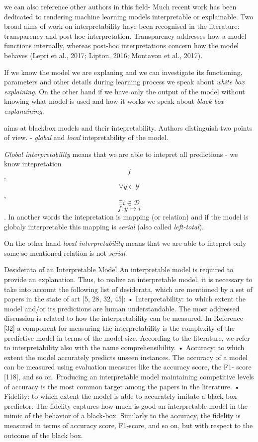     we can also reference other authors in this field- \cite{Mittelstadt2019}
    Much recent work has been dedicated to rendering machine learning models interpretable or explainable. Two broad aims of work on
    interpretability have been recognised in the literature: transparency
    and post-hoc interpretation. Transparency addresses how a model
    functions internally, whereas post-hoc interpretations concern how
    the model behaves (Lepri et al., 2017; Lipton, 2016; Montavon et al.,
    2017).



If we know the model we are explaning and we can investigate its functioning, parameters and other details during learning process we speak about \emph{white box explaining}. On the other hand if we have only the output of the model without knowing what model is used and how it works we speak about \emph{black box explanaining}.

\cite{Guidotti2018} aims at blackbox models and their intepretability. Authors distinguish two points of view. - \emph{global} and \emph{local} intepretability of the model.

\emph{Global interpretability} means that we are able to intepret all predictions - we know intepretation $$f$$: $$\forall y \in \mathcal{Y}$$, $$\exists i \in \mathcal{D}$$ $$f: y\mapsto i$$. In another words the intepretation is mapping (or relation) and if the model is globaly interpretable this mapping is \emph{serial} (also called \emph{left-total}).

On the other hand \emph{local interpretability} means that we are able to intepret only some so mentioned relation is not \emph{serial}.


\cite{Guidotti2018} 
Desiderata of an Interpretable Model
An interpretable model is required to provide an explanation. Thus, to realize an interpretable
model, it is necessary to take into account the following list of desiderata, which are mentioned
by a set of papers in the state of art [5, 28, 32, 45]:
• Interpretability: to which extent the model and/or its predictions are human understandable. The most addressed discussion is related to how the interpretability can be measured.
In Reference [32] a component for measuring the interpretability is the complexity of the
predictive model in terms of the model size. According to the literature, we refer to interpretability also with the name comprehensibility.
• Accuracy: to which extent the model accurately predicts unseen instances. The accuracy
of a model can be measured using evaluation measures like the accuracy score, the F1-
score [118], and so on. Producing an interpretable model maintaining competitive levels of
accuracy is the most common target among the papers in the literature.
• Fidelity: to which extent the model is able to accurately imitate a black-box predictor. The
fidelity captures how much is good an interpretable model in the mimic of the behavior of
a black-box. Similarly to the accuracy, the fidelity is measured in terms of accuracy score,
F1-score, and so on, but with respect to the outcome of the black box.

